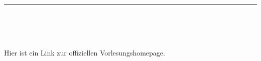 \hrule \mbox{ }\\[0.7cm]
\begin{minipage}{4cm}
	\qrcode[height=3.3cm, version=6]{\homepage}
\end{minipage}
\hfill
\begin{minipage}{\dieBreite}
	\\
	\resizebox{\dieBreite}{!}{\footnotesize\url{\homepage}}\smallskip\\
	Hier ist ein Link zur offiziellen Vorlesungshomepage.
\end{minipage}
\newpage
